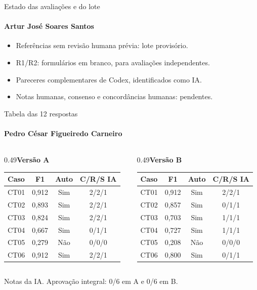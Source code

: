 \documentclass[aspectratio=169,11pt]{beamer}
\newcommand{\pessoa}[1]{\framesubtitle{#1}}
\begin{document}
\begin{frame}{Estado das avaliações e do lote}
\pessoa{Artur José Soares Santos}
\begin{itemize}\setlength{\itemsep}{1em}
\item Referências sem revisão humana prévia: lote provisório.
\item R1/R2: formulários em branco, para avaliações independentes.
\item Pareceres complementares de Codex, identificados como IA.
\item Notas humanas, consenso e concordâncias humanas: pendentes.
\end{itemize}\end{frame}
\begin{frame}{Tabela das 12 respostas}
\pessoa{Pedro César Figueiredo Carneiro}
\begin{columns}[T]
\begin{column}{0.49\textwidth}\centering\textbf{Versão A}\par\medskip
\small\begin{tabular}{lccc}\toprule Caso & F1 & Auto & C/R/S IA \\\midrule
CT01 & 0,912 & Sim & 2/2/1 \\
CT02 & 0,893 & Sim & 2/2/1 \\
CT03 & 0,824 & Sim & 2/2/1 \\
CT04 & 0,667 & Sim & 0/1/1 \\
CT05 & 0,279 & Não & 0/0/0 \\
CT06 & 0,912 & Sim & 2/2/1 \\\bottomrule\end{tabular}
\end{column}
\begin{column}{0.49\textwidth}\centering\textbf{Versão B}\par\medskip
\small\begin{tabular}{lccc}\toprule Caso & F1 & Auto & C/R/S IA \\\midrule
CT01 & 0,912 & Sim & 2/2/1 \\
CT02 & 0,857 & Sim & 0/1/1 \\
CT03 & 0,703 & Sim & 1/1/1 \\
CT04 & 0,727 & Sim & 1/1/1 \\
CT05 & 0,208 & Não & 0/0/0 \\
CT06 & 0,800 & Sim & 0/1/1 \\\bottomrule\end{tabular}
\end{column}\end{columns}\bigskip
\alert{Notas da IA. Aprovação integral: 0/6 em A e 0/6 em B.}
\end{frame}
\end{document}

